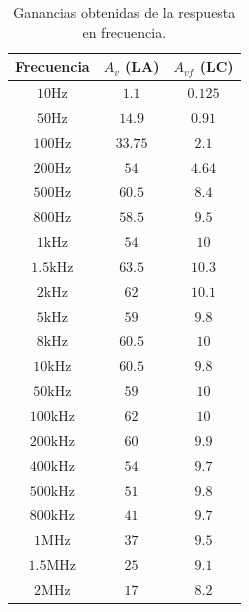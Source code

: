 \begin{table}[!ht]
    \centering
    \begin{tabular}{|c|c|c|}
        \hline
        \textbf{Frecuencia} & \textbf{$A_v$ (LA)} & \textbf{$A_{vf}$ (LC)} \\ \hline
        $10 \si{\hertz}$        & $1.1$     & $0.125$ \\ \hline
        $50 \si{\hertz}$        & $14.9$    & $0.91$ \\ \hline
        $100 \si{\hertz}$       & $33.75$   & $2.1$ \\ \hline
        $200 \si{\hertz}$       & $54$      & $4.64$ \\ \hline
        $500 \si{\hertz}$       & $60.5$    & $8.4$ \\ \hline
        $800 \si{\hertz}$       & $58.5$    & $9.5$ \\ \hline
        $1 \si{\kilo\hertz}$    & $54$      & $10$ \\ \hline
        $1.5 \si{\kilo\hertz}$  & $63.5$    & $10.3$ \\ \hline
        $2 \si{\kilo\hertz}$    & $62$      & $10.1$ \\ \hline
        $5 \si{\kilo\hertz}$    & $59$      & $9.8$ \\ \hline
        $8 \si{\kilo\hertz}$    & $60.5$    & $10$ \\ \hline
        $10 \si{\kilo\hertz}$   & $60.5$    & $9.8$ \\ \hline
        $50 \si{\kilo\hertz}$   & $59$      & $10$ \\ \hline
        $100 \si{\kilo\hertz}$  & $62$      & $10$ \\ \hline
        $200 \si{\kilo\hertz}$  & $60$      & $9.9$ \\ \hline
        $400 \si{\kilo\hertz}$  & $54$      & $9.7$ \\ \hline
        $500 \si{\kilo\hertz}$  & $51$      & $9.8$ \\ \hline
        $800 \si{\kilo\hertz}$  & $41$      & $9.7$ \\ \hline
        $1 \si{\mega\hertz}$    & $37$      & $9.5$ \\ \hline
        $1.5 \si{\mega\hertz}$  & $25$      & $9.1$ \\ \hline
        $2 \si{\mega\hertz}$    & $17$      & $8.2$ \\ \hline
    \end{tabular}
    \label{tab:rta_frec}
    \caption{Ganancias obtenidas de la respuesta en frecuencia.}
\end{table}

